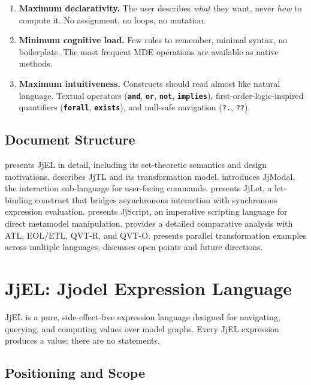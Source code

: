 \documentclass[11pt,a4paper]{article}
\newcommand{\jjmodal}{\textsf{JjModal}}
\newcommand{\jjlet}{\textsf{JjLet}}
\newcommand{\jjscript}{\textsf{JjScript}}
\newcommand{\jjel}{\textsf{JjEL}}
\newcommand{\jjtl}{\textsf{JjTL}}
\newcommand{\kw}[1]{\texttt{\textbf{#1}}}
\begin{document}
\begin{enumerate}
    \item \textbf{Maximum declarativity.} The user describes \emph{what} they want, never \emph{how} to compute it. No assignment, no loops, no mutation.
    \item \textbf{Minimum cognitive load.} Few rules to remember, minimal syntax, no boilerplate. The most frequent MDE operations are available as native methods.
    \item \textbf{Maximum intuitiveness.} Constructs should read almost like natural language. Textual operators (\kw{and}, \kw{or}, \kw{not}, \kw{implies}), first-order-logic-inspired quantifiers (\kw{forall}, \kw{exists}), and null-safe navigation (\texttt{?.}, \texttt{??}).
\end{enumerate}

\subsection{Document Structure}

 presents \jjel{} in detail, including its set-theoretic semantics and design motivations.  describes \jjtl{} and its transformation model.  introduces \jjmodal{}, the interaction sub-language for user-facing commands.  presents \jjlet{}, a let-binding construct that bridges asynchronous interaction with synchronous expression evaluation.  presents \jjscript{}, an imperative scripting language for direct metamodel manipulation.  provides a detailed comparative analysis with ATL, EOL/ETL, QVT-R, and QVT-O.  presents parallel transformation examples across multiple languages.  discusses open points and future directions.


\section{JjEL: Jjodel Expression Language}\label{sec:jjel}

\jjel{} is a pure, side-effect-free expression language designed for navigating, querying, and computing values over model graphs. Every \jjel{} expression produces a value; there are no statements.

\subsection{Positioning and Scope}
\end{document}
